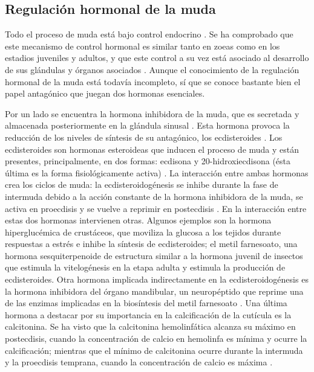 \documentclass[a4paper]{article}
\begin{document}
\subsection{Regulación hormonal de la muda}
Todo el proceso de muda está bajo control endocrino \citep{Techa2013}. Se ha comprobado que este mecanismo de control hormonal es similar tanto en zoeas como en los estadios juveniles y adultos, y que este control a su vez está asociado al desarrollo de sus glándulas y órganos asociados \citep{Webster1991}. Aunque el conocimiento de la regulación hormonal de la muda está todavía incompleto, sí que se conoce bastante bien el papel antagónico que juegan dos hormonas esenciales.\par Por un lado se encuentra la hormona inhibidora de la muda, que es secretada y almacenada posteriormente en la glándula sinusal \citep{Hartnoll2001}. Esta hormona provoca la reducción de los niveles de síntesis de su antagónico, los ecdisteroides \citep{Anger2001, Hartnoll2001}. Los ecdisteroides son hormonas esteroideas que inducen el proceso de muda y están presentes, principalmente, en dos formas: ecdisona y 20-hidroxiecdisona (ésta última es la forma fisiológicamente activa) \citep{Das2016}. La interacción entre ambas hormonas crea los ciclos de muda: la ecdisteroidogénesis se inhibe durante la fase de intermuda debido a la acción constante de la hormona inhibidora de la muda, se activa en proecdisis y se vuelve a reprimir en postecdisis \citep{Zou2004}. En la interacción entre estas dos hormonas intervienen otras. Algunos ejemplos son la hormona hiperglucémica de crustáceos, que moviliza la glucosa a los tejidos durante respuestas a estrés \citep{Hartnoll2001} e inhibe la síntesis de ecdisteroides; el metil farnesoato, una hormona sesquiterpenoide de estructura similar a la hormona juvenil de insectos que estimula la vitelogénesis en la etapa adulta \citep{Hartnoll2001} y estimula la producción de ecdisteroides. Otra hormona implicada indirectamente en la ecdisteroidogénesis es la hormona inhibidora del órgano mandibular, un neuropéptido que reprime una de las enzimas implicadas en la biosíntesis del metil farnesoato \citep{Wainwright1996}. Una última hormona a destacar por su importancia en la calcificación de la cutícula es la calcitonina. Se ha visto que la calcitonina hemolinfática alcanza su máximo en postecdisis, cuando la concentración de calcio en hemolinfa es mínima y ocurre la calcificación; mientras que el mínimo de calcitonina ocurre durante la intermuda y la proecdisis temprana, cuando la concentración de calcio es máxima \citep{Arlot1986}.
\end{document}
